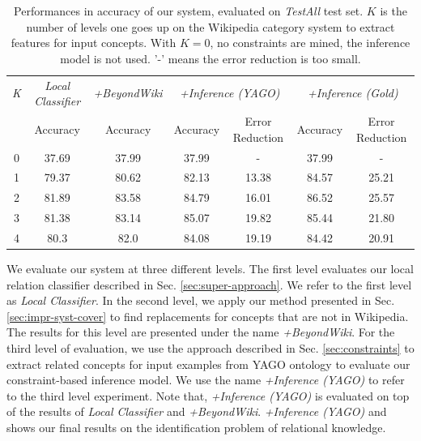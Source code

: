 \begin{table}[t]
  \begin{center}
    \begin{tabular}{|c||c|c|c|c||c|c|}
      \hline
      {\em K}  &  {\em Local Classifier}  &  {\em +BeyondWiki}  &  \multicolumn{2}{|c||}{{\em +Inference (YAGO)}}  &  \multicolumn{2}{|c|}{{\em +Inference (Gold)}} \\ \cline{4-7}
      &          Accuracy  &            Accuracy  &            Accuracy  &  Error Reduction  &  Accuracy            &  Error Reduction  \\
      \hline
      \hline
      0  &             37.69  &               37.99  &               37.99  &              -    &  37.99               &           -       \\
      1  &             79.37  &               80.62  &               82.13  &           13.38   &  84.57               &         25.21     \\
      2  &             81.89  &               83.58  &               84.79  &           16.01   &  86.52               &         25.57     \\
      3  &             81.38  &               83.14  &               85.07  &           19.82   &  85.44               &         21.80     \\
      4  &              80.3  &                82.0  &               84.08  &           19.19   &  84.42               &         20.91     \\
      \hline
    \end{tabular}
    \caption{Performances in accuracy of our system, evaluated on {\em
        TestAll} test set. $K$ is the number of levels one goes up on
      the Wikipedia category system to extract features for input
      concepts. With $K=0$, no constraints are mined, the inference
      model is not used. '-' means the error reduction is too small.}
    \label{table:all-performances}
  \end{center}
\end{table}

We evaluate our system at three different levels. The
first level evaluates our local relation classifier described in
Sec. \ref{sec:super-approach}. We refer to the first level as {\em
  Local Classifier}. In the second level, we apply our method
presented in Sec. \ref{sec:impr-syst-cover} to find replacements for
concepts that are not in Wikipedia. The results for this level are
presented under the name {\em +BeyondWiki}. For the third
level of evaluation, we use the approach described in
Sec. \ref{sec:constraints} to extract related concepts for input
examples from YAGO ontology to evaluate our constraint-based inference
model. We use the name {\em +Inference (YAGO)} to refer to the third
level experiment. Note that, {\em +Inference (YAGO)} is evaluated on
top of the results of {\em Local Classifier} and {\em +BeyondWiki}.
{\em +Inference (YAGO)} and shows our final results on the identification
problem of relational knowledge.

